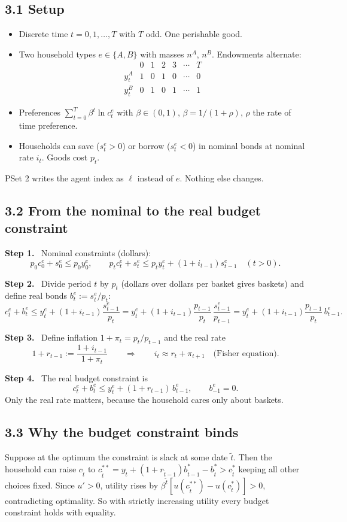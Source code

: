 \documentclass[12pt]{article}
\newcommand{\st}[1]{\par\smallskip\textbf{Step #1.}\ }
\newcommand{\ans}[1]{\[\boxed{\ #1\ }\]}
\begin{document}
\subsection*{3.1 Setup}
\begin{itemize}
\item Discrete time $t=0,1,\dots,T$ with $T$ odd. One perishable good.
\item Two household types $e\in\{A,B\}$ with masses $n^A$, $n^B$. Endowments alternate:
\[
\begin{array}{c|cccccc}
 & 0&1&2&3&\cdots&T\\\hline
y^A_t&1&0&1&0&\cdots&0\\
y^B_t&0&1&0&1&\cdots&1
\end{array}
\]
\item Preferences $\sum_{t=0}^T\beta^t\ln c^e_t$ with $\beta\in(0,1)$, $\beta=1/(1+\rho)$, $\rho$ the rate of time preference.
\item Households can save ($s^e_t>0$) or borrow ($s^e_t<0$) in nominal bonds at nominal rate $i_t$. Goods cost $p_t$.
\end{itemize}
PSet 2 writes the agent index as $\ell$ instead of $e$. Nothing else changes.

\subsection*{3.2 From the nominal to the real budget constraint}
\st{1} Nominal constraints (dollars):
\[
p_0c^e_0+s^e_0\le p_0y^e_0,\qquad p_tc^e_t+s^e_t\le p_ty^e_t+(1+i_{t-1})s^e_{t-1}\quad(t>0).
\]
\st{2} Divide period $t$ by $p_t$ (dollars over dollars per basket gives baskets)
and define real bonds $b^e_t:=s^e_t/p_t$:
\[
c^e_t+b^e_t\le y^e_t+(1+i_{t-1})\frac{s^e_{t-1}}{p_t}
=y^e_t+(1+i_{t-1})\frac{p_{t-1}}{p_t}\,\frac{s^e_{t-1}}{p_{t-1}}
=y^e_t+(1+i_{t-1})\frac{p_{t-1}}{p_t}\,b^e_{t-1}.
\]
\st{3} Define inflation $1+\pi_t=p_t/p_{t-1}$ and the real rate
\[
1+r_{t-1}:=\frac{1+i_{t-1}}{1+\pi_t}\qquad\Longrightarrow\qquad i_t\approx r_t+\pi_{t+1}\quad\text{(Fisher equation).}
\]
\st{4} The real budget constraint is
\ans{c^e_t+b^e_t\le y^e_t+(1+r_{t-1})\,b^e_{t-1},\qquad b^e_{-1}=0.}
Only the real rate matters, because the household cares only about baskets.

\subsection*{3.3 Why the budget constraint binds}
Suppose at the optimum the constraint is slack at some date $\tilde t$. Then the
household can raise $c_{\tilde t}$ to
$c^{**}_{\tilde t}=y_{\tilde t}+(1+r_{\tilde t-1})b^*_{\tilde t-1}-b^*_{\tilde t}>c^*_{\tilde t}$
keeping all other choices fixed. Since $u'>0$, utility rises by
$\beta^{\tilde t}[u(c^{**}_{\tilde t})-u(c^*_{\tilde t})]>0$, contradicting
optimality. So with strictly increasing utility every budget constraint holds with equality.
\end{document}
